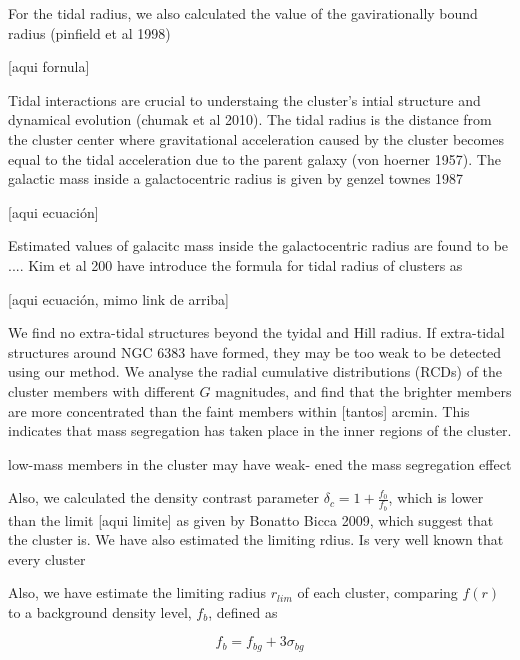 \documentclass[fleqn,usenatbib,usedcolumn,useAMS]{mnras}
\begin{document}
For the tidal radius, we also calculated the value of the gavirationally bound radius (pinfield et al 1998) %

[aqui fornula]

Tidal interactions are crucial to understaing the cluster's intial structure and dynamical evolution (chumak et al 2010). The tidal radius is the distance from the cluster center where gravitational acceleration caused by the cluster becomes equal to the tidal acceleration due to the parent galaxy (von hoerner 1957). The galactic mass inside a galactocentric radius is given by genzel townes 1987 

[aqui ecuación] %

Estimated values of galacitc mass inside the galactocentric radius are found to be .... Kim et al 200 have introduce the formula for tidal radius of clusters as 

[aqui ecuación, mimo link de arriba]

We find no extra-tidal structures beyond the tyidal and Hill radius. If extra-tidal structures around NGC 6383 have formed, they may be too weak to be detected using our method. We analyse the radial cumulative distributions (RCDs) of the cluster members with different $G$ magnitudes, and find that the brighter members are more concentrated than the faint members within [tantos] arcmin. This indicates that mass segregation has taken place in the inner regions of the cluster.

low-mass members in the cluster may have weak- ened the mass segregation effect

Also, we calculated the density contrast parameter $\delta_c = 1 + \frac{f_0}{f_b}$, which is lower than the limit [aqui limite] as given by Bonatto Bicca 2009, which suggest that the cluster is.  We have also estimated the limiting rdius. Is very well known that every cluster


Also, we have estimate the limiting radius $r_{lim}$ of each cluster, comparing $f(r)$ to a background density level, $f_b$, defined as 


\begin{equation*}
	f_b = f_{bg} + 3\sigma_{bg}
\end{equation*}
\end{document}
